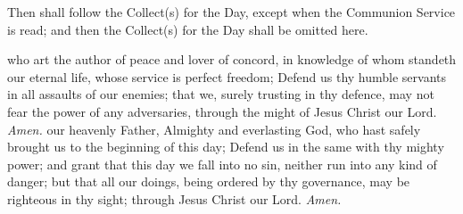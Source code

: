 \begin{rubric}
Then shall follow the Collect(s) for the Day, except when the Communion Service is read; and then the Collect(s) for the Day shall be omitted here.
\end{rubric}
\vspace{-2ex}
 who art the author of peace and lover of concord, in knowledge of whom standeth our eternal life, whose service is perfect freedom; Defend us thy humble servants in all assaults of our enemies; that we, surely trusting in thy defence, may not fear the power of any adversaries, through the might of Jesus Christ our Lord. \textit{Amen.}
 our heavenly Father, Almighty and everlasting God, who hast safely brought us to the beginning of this day; Defend us in the same with thy mighty power; and grant that this day we fall into no sin, neither run into any kind of danger; but that all our doings, being ordered by thy governance, may be righteous in thy sight; through Jesus Christ our Lord. \textit{Amen.}

